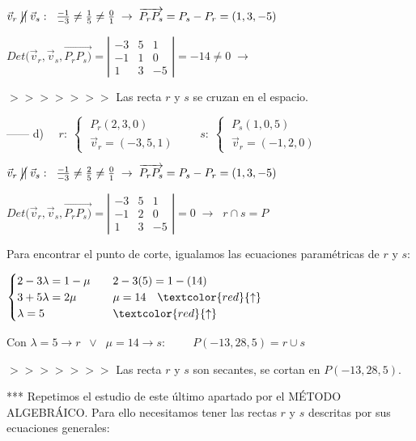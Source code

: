 \noindent $\vec v_r \; \cancel{||} \; \vec v_s:\;\; \frac {-1}{-3}\neq\frac {1}{5}\neq\frac {0}{1}\; \to \; \overrightarrow{P_rP_s}=P_s-P_r=(1,3,-5)$

\noindent $Det(\vec v_r,\vec v_s, \overrightarrow{P_rP_s)} = \left| \begin{matrix} -3&5&1 \\ -1&1&0 \\ 1&3&-5 \end{matrix} \right|=-14 \neq 0  \;\to\;$ 

$>>>>>>>$ Las recta $r$ y $s$ se cruzan en el espacio.

\noindent ------ d) $\quad r:\; \begin{cases} \; P_r(2,3,0) \\ \; \vec v_r=(-3,5,1) \end{cases} \qquad s:\; \begin{cases} \; P_s(1,0,5) \\ \; \vec v_r=(-1,2,0) \end{cases}$


\noindent $\vec v_r \; \cancel{||} \; \vec v_s:\;\; \frac {-1}{-3}\neq\frac {2}{5}\neq\frac {0}{1}\; \to \; \overrightarrow{P_rP_s}=P_s-P_r=(1,3,-5)$

\noindent $Det(\vec v_r,\vec v_s, \overrightarrow{P_rP_s)} = \left| \begin{matrix} -3&5&1 \\ -1&2&0 \\ 1&3&-5 \end{matrix} \right|= 0  \;\to\; \boxed{\;r\cap s=P\;}$ 

\noindent Para encontrar el punto de corte, igualamos las ecuaciones paramétricas de $r$ y $s$:

\noindent $\begin{cases} 2-3\lambda = 1-\mu & \quad 2-3(5)=1-(14)\\
3+5\lambda=2\mu &  \quad  \mu = 14 \quad  \textcolor{red}{\uparrow} \\
\lambda = 5 & \quad  \textcolor{red}{\uparrow}	
\end{cases}
$

\noindent Con $\lambda=5 \to r \;\;\vee \;\; \mu=14 \to s:\qquad \boxed{\;P(-13,28,5)=r\cup s\;}$


$>>>>>>>$ Las recta $r$ y $s$ son secantes, se cortan en $P(-13,28,5)$.

*** Repetimos el estudio de este último apartado por el MÉTODO ALGEBRÁICO. Para ello necesitamos tener las rectas $r$ y $s$ descritas por sus ecuaciones generales:

